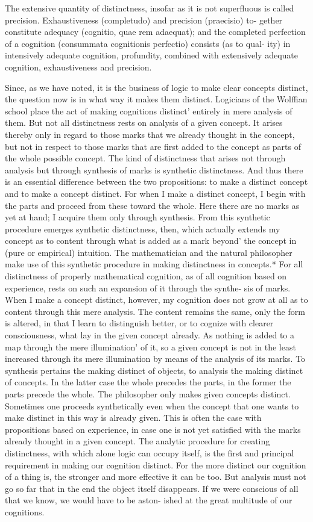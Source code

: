 The extensive quantity of distinctness, insofar as it is not superfluous is
called precision. Exhaustiveness (completudo) and precision (praecisio) to-
gether constitute adequacy (cognitio, quae rem adaequat); and the completed
perfection of a cognition (consummata cognitionis perfectio) consists (as to qual-
ity) in intensively adequate cognition, profundity, combined with extensively
adequate cognition, exhaustiveness and precision.

Since, as we have noted, it is the business of logic to make clear concepts
distinct, the question now is in what way it makes them distinct.
Logicians of the Wolffian school place the act of making cognitions
distinct' entirely in mere analysis of them. But not all distinctness rests on
analysis of a given concept. It arises thereby only in regard to those marks
that we already thought in the concept, but not in respect to those marks
that are first added to the concept as parts of the whole possible concept.
The kind of distinctness that arises not through analysis but through
synthesis of marks is synthetic distinctness. And thus there is an essential
difference between the two propositions: to make a distinct concept and to
make a concept distinct.
For when I make a distinct concept, I begin with the parts and proceed
from these toward the whole. Here there are no marks as yet at hand; I
acquire them only through synthesis. From this synthetic procedure
emerges synthetic distinctness, then, which actually extends my concept
as to content through what is added as a mark beyond' the concept in (pure
or empirical) intuition. The mathematician and the natural philosopher
make use of this synthetic procedure in making distinctness in concepts.*
For all distinctness of properly mathematical cognition, as of all cognition
based on experience, rests on such an expansion of it through the synthe-
sis of marks.
When I make a concept distinct, however, my cognition does not grow
at all as to content through this mere analysis. The content remains the
same, only the form is altered, in that I learn to distinguish better, or to
cognize with clearer consciousness, what lay in the given concept already.
As nothing is added to a map through the mere illumination' of it, so a
given concept is not in the least increased through its mere illumination
by means of the analysis of its marks.
To synthesis pertains the making distinct of objects, to analysis the
making distinct of concepts. In the latter case the whole precedes the parts, in
the former the parts precede the whole. The philosopher only makes given
concepts distinct.
Sometimes one proceeds synthetically even when the
concept that one wants to make distinct in this way is already given.
 This is often the case with propositions based on experience, in case one is not
yet satisfied with the marks already thought in a given concept.
The analytic procedure for creating distinctness, with which alone logic
can occupy itself, is the first and principal requirement in making our
cognition distinct.
For the more distinct our cognition of a thing is, the
stronger and more effective it can be too.
 But analysis must not go so far
that in the end the object itself disappears.
If we were conscious of all that we know, we would have to be aston-
ished at the great multitude of our cognitions.

